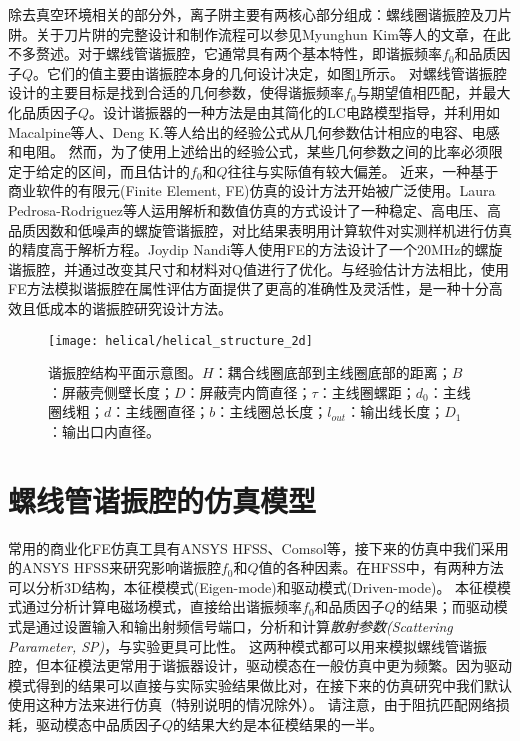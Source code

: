 除去真空环境相关的部分外，离子阱主要有两核心部分组成：螺线圈谐振腔及刀片阱。关于刀片阱的完整设计和制作流程可以参见Myunghun Kim等人\cite[]{Kim_Kim_Hong_Lee_Moon_Lee_Kim_Ha_Sim_Lee_2022}的文章，在此不多赘述。对于螺线管谐振腔，它通常具有两个基本特性，即谐振频率$f_0$和品质因子$Q$。它们的值主要由谐振腔本身的几何设计决定，如图\ref{fig:helical_structure_2d}所示。
对螺线管谐振腔设计的主要目标是找到合适的几何参数，使得谐振频率$f_0$与期望值相匹配，并最大化品质因子$Q$。设计谐振器的一种方法是由其简化的LC电路模型指导，并利用如Macalpine等人\cite[]{Macalpine_Schildknecht_1959}、Deng K.等人\cite[]{Deng_Sun_Yuan_Xu_Zhang_Lu_Luo_2014}给出的经验公式从几何参数估计相应的电容、电感和电阻。
然而，为了使用上述给出的经验公式，某些几何参数之间的比率必须限定于给定的区间，而且估计的$f_0$和$Q$往往与实际值有较大偏差。
近来，一种基于商业软件的有限元(Finite Element, FE)仿真的设计方法开始被广泛使用。Laura Pedrosa-Rodriguez等人\cite[]{Pedrosa_Rodriguez_Outerelo_Gomez_Alcala_de_Vicente_Diaz_Otero_2018}运用解析和数值仿真的方式设计了一种稳定、高电压、高品质因数和低噪声的螺旋管谐振腔，对比结果表明用计算软件对实测样机进行仿真的精度高于解析方程。Joydip Nandi等人\cite[]{Nandi_Sikdar_Reza_Misra_Das_Ray_2020}使用FE的方法设计了一个20MHz的螺旋谐振腔，并通过改变其尺寸和材料对Q值进行了优化。与经验估计方法相比，使用FE方法模拟谐振腔在属性评估方面提供了更高的准确性及灵活性，是一种十分高效且低成本的谐振腔研究设计方法。

\begin{figure}
    \centering
    \caption[谐振腔结构平面示意图]{谐振腔结构平面示意图。$H$：耦合线圈底部到主线圈底部的距离；$B$：屏蔽壳侧壁长度；$D$：屏蔽壳内筒直径；$\tau$：主线圈螺距；$d_0$：主线圈线粗；$d$：主线圈直径；$b$：主线圈总长度；$l_{out}$：输出线长度；$D_1$：输出口内直径。\label{fig:helical_structure_2d}}
    \texttt{[image: helical/helical\_structure\_2d]}
\end{figure}

\section[螺线管谐振腔的仿真模型]{螺线管谐振腔的仿真模型}

常用的商业化FE仿真工具有ANSYS HFSS、Comsol等，接下来的仿真中我们采用的ANSYS HFSS来研究影响谐振腔$f_0$和$Q$值的各种因素。在HFSS中，有两种方法可以分析3D结构，本征模模式(Eigen-mode)和驱动模式(Driven-mode)。
本征模模式通过分析计算电磁场模式，直接给出谐振频率$f_0$和品质因子$Q$的结果；而驱动模式是通过设置输入和输出射频信号端口，分析和计算\emph{散射参数(Scattering Parameter, SP)}，与实验更具可比性。
这两种模式都可以用来模拟螺线管谐振腔，但本征模法更常用于谐振器设计，驱动模态在一般仿真中更为频繁。因为驱动模式得到的结果可以直接与实际实验结果做比对，在接下来的仿真研究中我们默认使用这种方法来进行仿真（特别说明的情况除外）。
请注意，由于阻抗匹配网络损耗\cite[]{Gandolfi_Niedermayr_Kumph_Brownnutt_Blatt_2012}，驱动模态中品质因子$Q$的结果大约是本征模结果的一半。

